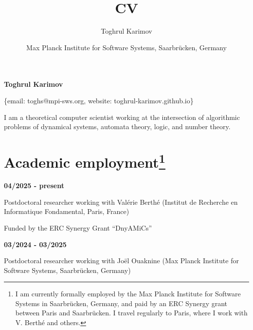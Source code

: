 \documentclass{article}
\title{CV}
\author{Toghrul Karimov}
\date{Max Planck Institute for Software Systems, Saarbr\"ucken, Germany}
\date{}
\begin{document}
	\begin{center}
		\bfseries\huge Toghrul Karimov
	\end{center}
	\begin{center}
		\large
		\{email: toghs@mpi-sws.org, website: toghrul-karimov.github.io\}
	\end{center}
	
	I am a theoretical computer scientist  working at the intersection of algorithmic problems of dynamical systems, automata theory, logic, and number theory.
	
	\section*{Academic employment\footnote{I am currently formally employed by the Max Planck Institute for Software Systems in Saarbrücken, Germany, and paid by an ERC Synergy grant between Paris and Saarbrücken. I travel regularly to Paris, where I work with V. Berth\'e and others.}}
	\begin{minipage}{0.3\textwidth}
		\hspace{0.1cm} \textbf{04/2025 - present}
	\end{minipage}
	\vspace*{0.25cm}
	\begin{minipage}{0.7\textwidth}
		Postdoctoral researcher working with Val\'erie Berth\'e (Institut de Recherche en Informatique Fondamental, Paris, France)  
		
		\vspace*{0.2cm}
		
		Funded by the ERC Synergy Grant ``DnyAMiCs''
		\vspace{0.3cm}
	\end{minipage}
	\vspace{0.85cm}
	\begin{minipage}{0.3\textwidth}
		\hspace{0.1cm} \textbf{03/2024 - 03/2025}
	\end{minipage}
	\begin{minipage}{0.7\textwidth}
		Postdoctoral researcher working with Jo\"el Ouaknine (Max Planck Institute for Software Systems, Saarbr\"ucken, Germany)
	\end{minipage}
	
	
\end{document}
